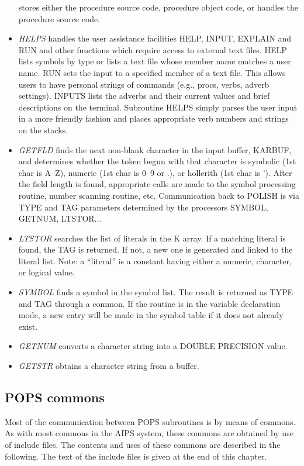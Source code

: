 \begin{itemize}
stores either the procedure source code, procedure object code, or
handles the procedure source code.
\item {\it HELPS}
handles the user assistance facilities HELP, INPUT, EXPLAIN and RUN
and other functions which require access to external text files. HELP
lists symbols by type or lists a text file whose member name matches a
user  name.  RUN sets the input to a specified member of a text file.
This allows users to have personal strings of commands (e.g., procs,
verbs, adverb settings). INPUTS lists the adverbs and their current
values and brief descriptions on the terminal. Subroutine HELPS simply
parses the user input in a more friendly fashion and places
appropriate verb numbers and strings on the stacks.
\item {\it GETFLD}
finds the next non-blank character in the input buffer, KARBUF, and
determines whether the token begun with that character is symbolic
(1st char is A--Z), numeric (1st char is 0--9 or .), or hollerith
(1st char is '). After the field length is found, appropriate calls
are made to the symbol processing routine, number scanning routine,
etc. Communication back to POLISH is via TYPE and TAG parameters
determined by the processors SYMBOL, GETNUM, LTSTOR...
\item {\it LTSTOR}
searches the list of literals in the K array.  If a matching literal
is found, the TAG is returned. If not, a new one is generated and
linked to the literal list.  Note: a ``literal'' is a constant having
either a numeric, character, or logical value.
\item {\it SYMBOL}
finds a symbol in the symbol list.  The result is returned as TYPE and
TAG through a common.  If the routine is in the variable declaration
mode, a new entry will be made in the symbol table if it does not
already exist.
\item {\it GETNUM}
converts a character string into a DOUBLE PRECISION value.
\item {\it GETSTR}
obtains a character string from a buffer.
\end{itemize} %

\subsection{POPS commons }
Most of the communication between POPS subroutines is by means of
commons.  As with most commons in the AIPS system, these commons are
obtained by use of include files. The contents and uses of these
commons are described in the following.  The text of the include files
is given at the end of this chapter.

